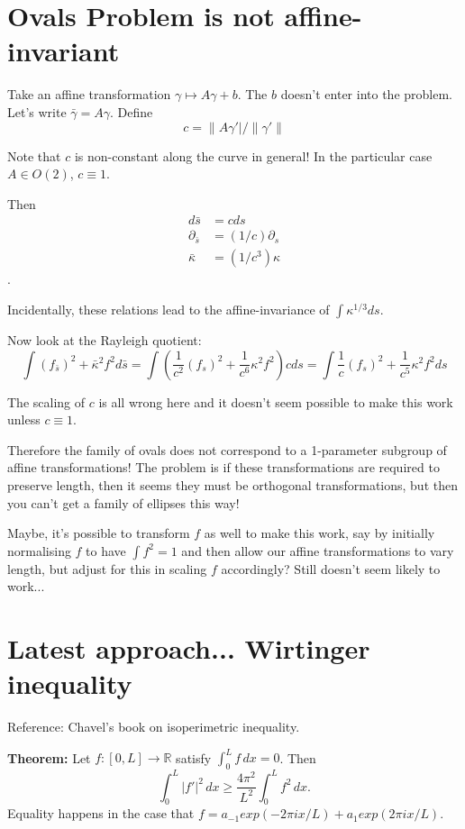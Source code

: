 \documentclass{amsart}
\begin{document}

\section*{Ovals Problem is not affine-invariant}

Take an affine transformation \(\gamma \mapsto A \gamma + b\). The \(b\) doesn't enter into the problem. Let's write \(\bar{\gamma} = A \gamma\). Define
\[
c = \|A\gamma'|/\|\gamma'\|
\]

Note that \(c\) is non-constant along the curve in general! In the particular case \(A \in O(2)\), \(c \equiv 1\).

Then 
\begin{align}
d\bar{s} &= c ds \\
\partial_{\bar{s}} &= (1/c) \partial_s \\ 
\bar{\kappa} &= (1/c^3) \kappa
\end{align}.

Incidentally, these relations lead to the affine-invariance of \(\int \kappa^{1/3} ds\).

Now look at the Rayleigh quotient:
\[
\int (f_{\bar{s}})^2 + \bar{\kappa}^2 f^2 d\bar{s} = \int \left(\frac{1}{c^2} (f_s)^2 + \frac{1}{c^6} \kappa^2 f^2\right) c ds = \int \frac{1}{c} (f_s)^2 + \frac{1}{c^5} \kappa^2 f^2 ds
\]

The scaling of \(c\) is all wrong here and it doesn't seem possible to make this work unless \(c \equiv 1\). 

Therefore the family of ovals does not correspond to a 1-parameter subgroup of affine transformations! The problem is if these transformations are required to preserve length, then it seems they must be orthogonal transformations, but then you can't get a family of ellipses this way!

Maybe, it's possible to transform \(f\) as well to make this work, say by initially normalising \(f\) to have \(\int f^2 = 1\) and then allow our affine transformations to vary length, but adjust for this in scaling \(f\) accordingly? Still doesn't seem likely to work...

\section*{Latest approach... Wirtinger inequality}

Reference:  Chavel's book on isoperimetric inequality.   

\bigskip
\textbf{Theorem:} Let $f:[0,L]\rightarrow \mathbb{R}$ satisfy $\int_0^L f\,dx=0$.   Then 
\[\int_0^L |f'|^2 \,dx\ge \frac{4\pi^2}{L^2}\int_0^L f^2\,dx.\tag{WI}\]
Equality happens in the case that $f=a_{-1}exp(-2\pi i x/L)+ a_{1}exp(2\pi i x/L).$
\end{document}
